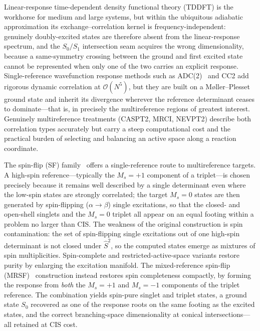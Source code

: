 \documentclass[aps,prb,reprint,superscriptaddress,floatfix]{revtex4-2}
\newcommand{\op}[1]{\hat{#1}}
\begin{document}
Linear-response time-dependent density functional theory (TDDFT) is the workhorse
for medium and large systems, but within the ubiquitous adiabatic approximation
its exchange--correlation kernel is frequency-independent: genuinely
doubly-excited states are therefore absent from the linear-response spectrum, and
the $S_0/S_1$ intersection seam acquires the wrong dimensionality, because a
same-symmetry crossing between the ground and first excited state cannot be
represented when only one of the two carries an explicit response. Single-reference
wavefunction response methods such as ADC(2)~\cite{schirmer1982,dreuw2015} and
CC2 add rigorous dynamic correlation at $\mathcal{O}(N^5)$, but they are built on
a M{\o}ller--Plesset ground state and inherit its divergence wherever the
reference determinant ceases to dominate---that is, in precisely the
multireference regions of greatest interest. Genuinely multireference treatments
(CASPT2, MRCI, NEVPT2) describe both correlation types accurately but carry a
steep computational cost and the practical burden of selecting and balancing an
active space along a reaction coordinate.

The spin-flip (SF) family~\cite{krylov2001} offers a single-reference route to
multireference targets. A high-spin reference---typically the $M_s=+1$ component
of a triplet---is chosen precisely because it remains well described by a single
determinant even where the low-spin states are strongly correlated; the target
$M_s=0$ states are then generated by spin-flipping ($\alpha\!\to\!\beta$) single
excitations, so that the closed- and open-shell singlets and the $M_s=0$ triplet
all appear on an equal footing within a problem no larger than CIS. The weakness
of the original construction is spin contamination: the set of spin-flipping
single excitations out of one high-spin determinant is not closed under
$\op{S}^2$, so the computed states emerge as mixtures of spin multiplicities.
Spin-complete and restricted-active-space variants restore purity by enlarging
the excitation manifold. The mixed-reference spin-flip
(MRSF)~\cite{lee2018,horbatenko2021} construction instead restores spin
completeness compactly, by forming the response from \emph{both} the $M_s=+1$ and
$M_s=-1$ components of the triplet reference. The combination yields spin-pure
singlet and triplet states, a ground state $S_0$ recovered as one of the response
roots on the same footing as the excited states, and the correct branching-space
dimensionality at conical intersections---all retained at CIS cost.
\end{document}
